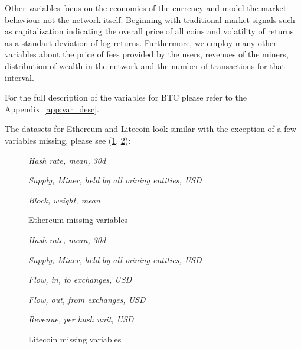 Other variables focus on the economics of the currency and model the market behaviour not the network itself. 
Beginning with traditional market signals such as capitalization indicating the overall price of all coins and volatility of returns 
as a standart deviation of log-returns. Furthermore, we employ many other variables about the price of fees 
provided by the users, revenues of the miners, distribution of wealth in the network and the number of transactions for that interval.


For the full description of the variables for \ac{BTC} please refer to the Appendix~\ref{app:var_desc}.


The datasets for Ethereum and Litecoin look similar with the exception of a few variables missing,
please see (\ref{ethereum:missing}, \ref{litecoin:missing}):

\begin{figure}[!htbp]
    \begin{center}
    \caption{Ethereum missing variables}\label{ethereum:missing}
    \begin{boxeditemize}
        \item \textit{Hash rate, mean, 30d}
        \item \textit{Supply, Miner, held by all mining entities, USD}
        \item \textit{Block, weight, mean}
    \end{boxeditemize}
    \end{center}
    \end{figure}

    \begin{figure}[!htbp]
        \begin{center}
        \caption{Litecoin missing variables}\label{litecoin:missing}
        \begin{boxeditemize}
            \item \textit{Hash rate, mean, 30d}
            \item \textit{Supply, Miner, held by all mining entities, USD}
            \item \textit{Flow, in, to exchanges, USD}
            \item \textit{Flow, out, from exchanges, USD}
            \item \textit{Revenue, per hash unit, USD}
        \end{boxeditemize}
        \end{center}
        \end{figure}



